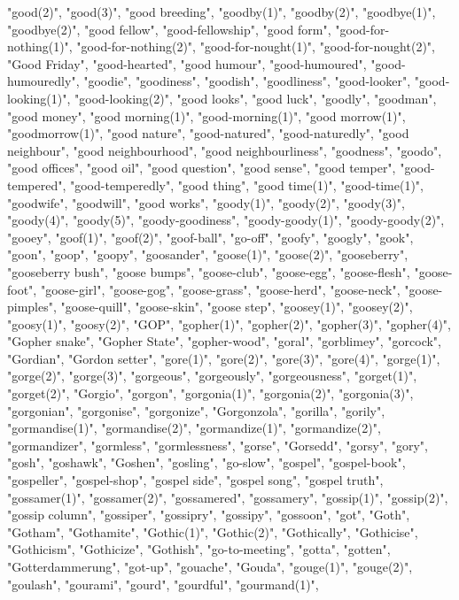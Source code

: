 "good(2)",
"good(3)",
"good breeding",
"goodby(1)",
"goodby(2)",
"goodbye(1)",
"goodbye(2)",
"good fellow",
"good-fellowship",
"good form",
"good-for-nothing(1)",
"good-for-nothing(2)",
"good-for-nought(1)",
"good-for-nought(2)",
"Good Friday",
"good-hearted",
"good humour",
"good-humoured",
"good-humouredly",
"goodie",
"goodiness",
"goodish",
"goodliness",
"good-looker",
"good-looking(1)",
"good-looking(2)",
"good looks",
"good luck",
"goodly",
"goodman",
"good money",
"good morning(1)",
"good-morning(1)",
"good morrow(1)",
"goodmorrow(1)",
"good nature",
"good-natured",
"good-naturedly",
"good neighbour",
"good neighbourhood",
"good neighbourliness",
"goodness",
"goodo",
"good offices",
"good oil",
"good question",
"good sense",
"good temper",
"good-tempered",
"good-temperedly",
"good thing",
"good time(1)",
"good-time(1)",
"goodwife",
"goodwill",
"good works",
"goody(1)",
"goody(2)",
"goody(3)",
"goody(4)",
"goody(5)",
"goody-goodiness",
"goody-goody(1)",
"goody-goody(2)",
"gooey",
"goof(1)",
"goof(2)",
"goof-ball",
"go-off",
"goofy",
"googly",
"gook",
"goon",
"goop",
"goopy",
"goosander",
"goose(1)",
"goose(2)",
"gooseberry",
"gooseberry bush",
"goose bumps",
"goose-club",
"goose-egg",
"goose-flesh",
"goose-foot",
"goose-girl",
"goose-gog",
"goose-grass",
"goose-herd",
"goose-neck",
"goose-pimples",
"goose-quill",
"goose-skin",
"goose step",
"goosey(1)",
"goosey(2)",
"goosy(1)",
"goosy(2)",
"GOP",
"gopher(1)",
"gopher(2)",
"gopher(3)",
"gopher(4)",
"Gopher snake",
"Gopher State",
"gopher-wood",
"goral",
"gorblimey",
"gorcock",
"Gordian",
"Gordon setter",
"gore(1)",
"gore(2)",
"gore(3)",
"gore(4)",
"gorge(1)",
"gorge(2)",
"gorge(3)",
"gorgeous",
"gorgeously",
"gorgeousness",
"gorget(1)",
"gorget(2)",
"Gorgio",
"gorgon",
"gorgonia(1)",
"gorgonia(2)",
"gorgonia(3)",
"gorgonian",
"gorgonise",
"gorgonize",
"Gorgonzola",
"gorilla",
"gorily",
"gormandise(1)",
"gormandise(2)",
"gormandize(1)",
"gormandize(2)",
"gormandizer",
"gormless",
"gormlessness",
"gorse",
"Gorsedd",
"gorsy",
"gory",
"gosh",
"goshawk",
"Goshen",
"gosling",
"go-slow",
"gospel",
"gospel-book",
"gospeller",
"gospel-shop",
"gospel side",
"gospel song",
"gospel truth",
"gossamer(1)",
"gossamer(2)",
"gossamered",
"gossamery",
"gossip(1)",
"gossip(2)",
"gossip column",
"gossiper",
"gossipry",
"gossipy",
"gossoon",
"got",
"Goth",
"Gotham",
"Gothamite",
"Gothic(1)",
"Gothic(2)",
"Gothically",
"Gothicise",
"Gothicism",
"Gothicize",
"Gothish",
"go-to-meeting",
"gotta",
"gotten",
"Gotterdammerung",
"got-up",
"gouache",
"Gouda",
"gouge(1)",
"gouge(2)",
"goulash",
"gourami",
"gourd",
"gourdful",
"gourmand(1)",
